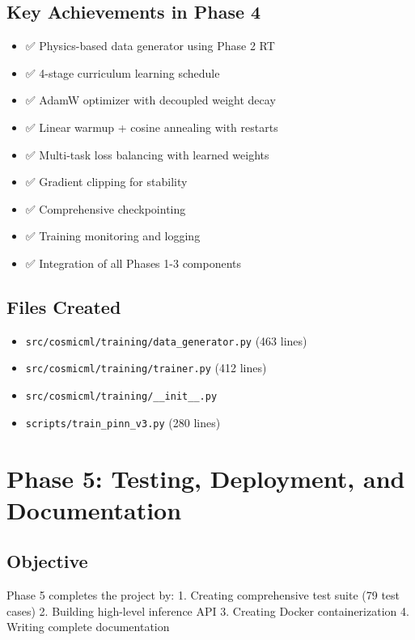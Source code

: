 \documentclass[12pt,a4paper,oneside]{report}
\begin{document}
\section{Key Achievements in Phase 4}

\begin{itemize}
    \item ✅ Physics-based data generator using Phase 2 RT
    \item ✅ 4-stage curriculum learning schedule
    \item ✅ AdamW optimizer with decoupled weight decay
    \item ✅ Linear warmup + cosine annealing with restarts
    \item ✅ Multi-task loss balancing with learned weights
    \item ✅ Gradient clipping for stability
    \item ✅ Comprehensive checkpointing
    \item ✅ Training monitoring and logging
    \item ✅ Integration of all Phases 1-3 components
\end{itemize}

\section{Files Created}

\begin{itemize}
    \item \texttt{src/cosmicml/training/data\_generator.py} (463 lines)
    \item \texttt{src/cosmicml/training/trainer.py} (412 lines)
    \item \texttt{src/cosmicml/training/\_\_init\_\_.py}
    \item \texttt{scripts/train\_pinn\_v3.py} (280 lines)
\end{itemize}

\newpage
\chapter{Phase 5: Testing, Deployment, and Documentation}

\section{Objective}

Phase 5 completes the project by:
1. Creating comprehensive test suite (79 test cases)
2. Building high-level inference API
3. Creating Docker containerization
4. Writing complete documentation
\end{document}
